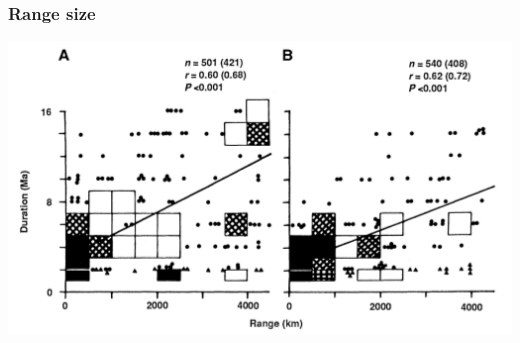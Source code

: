 \documentclass{beamer}
\begin{document}
\begin{frame}
  \frametitle{Range size}

  \begin{center}
    \includegraphics[height = 0.8\textheight, width = \textwidth, keepaspectratio = true]{figure/range}

    \tiny{}
  \end{center}
\end{frame}
\end{document}

